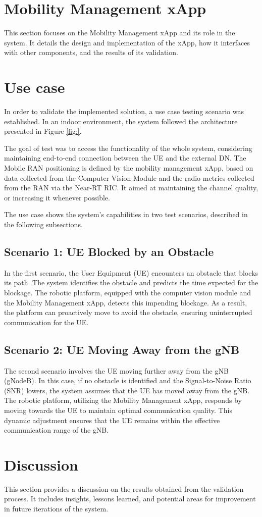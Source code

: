 \section{Mobility Management xApp}\label{sec:mm_xapp}
This section focuses on the Mobility Management xApp and its role in the system. It details the design and implementation of the xApp, how it interfaces with other components, and the results of its validation.

\section{Use case}\label{sec:use_case}
In order to validate the implemented solution, a use case testing scenario was established. In an indoor environment, the system followed the architecture presented in Figure \ref{fig:}. 


The goal of test was to access the functionality of the whole system, considering maintaining end-to-end connection between the UE and the external DN. The Mobile RAN positioning is defined by the mobility management xApp, based on data collected from the Computer Vision Module and the radio metrics collected from the RAN via the Near-RT RIC. It aimed at maintaining the channel quality, or increasing it whenever possible.

The use case shows the system's capabilities in two test scenarios, described in the following subsections. 

\subsection{Scenario 1: UE Blocked by an Obstacle}


In the first scenario, the User Equipment (UE) encounters an obstacle that blocks its path.
The system identifies the obstacle and predicts the time expected for the blockage.
The robotic platform, equipped with the computer vision module and the Mobility Management xApp, detects this impending blockage.
As a result, the platform can proactively move to avoid the obstacle, ensuring uninterrupted communication for the UE.

\subsection{Scenario 2: UE Moving Away from the gNB}

The second scenario involves the UE moving further away from the gNB (gNodeB).
In this case, if no obstacle is identified and the Signal-to-Noise Ratio (SNR) lowers, the system assumes that the UE has moved away from the gNB.
The robotic platform, utilizing the Mobility Management xApp, responds by moving towards the UE to maintain optimal communication quality.
This dynamic adjustment ensures that the UE remains within the effective communication range of the gNB.


\section{Discussion}\label{sec:discuss}
This section provides a discussion on the results obtained from the validation process.
It includes insights, lessons learned, and potential areas for improvement in future iterations of the system.
